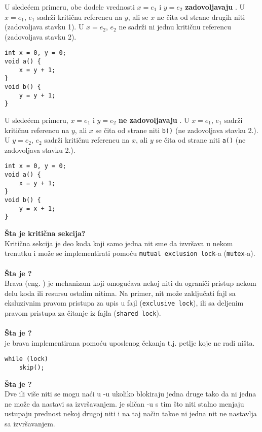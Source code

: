 U slede\'{c}em primeru, obe dodele vrednosti $x=e_1$ i $y=e_2$ \textbf{zadovoljavaju} . U $x=e_1$, $e_1$ sadr\v{z}i kriti\v{c}nu referencu na $y$, ali se $x$ ne \v{c}ita od strane drugih niti (zadovoljava stavku 1). U $x=e_2$, $e_2$ ne sadr\v{z}i ni jednu kriti\v{c}nu referencu (zadovoljava stavku 2).
\begin{lstlisting}
int x = 0, y = 0;
void a() {
    x = y + 1;
}
void b() {
    y = y + 1;
}
\end{lstlisting}
U slede\'{c}em primeru, $x=e_1$ i $y=e_2$ \textbf{ne zadovoljavaju} . U $x = e_1$, $e_1$ sadr\v{z}i kriti\v{c}nu referencu na $y$, ali $x$ se \v{c}ita od strane niti \texttt{b()} (ne zadovoljava stavku 2.). U $y = e_2$, $e_2$ sadr\v{z}i kriti\v{c}nu referencu na $x$, ali $y$ se \v{c}ita od strane niti \texttt{a()} (ne zadovoljava stavku 2.).
\begin{lstlisting}
int x = 0, y = 0;
void a() {
    x = y + 1;
}
void b() {
    y = x + 1;
}
\end{lstlisting}
\textbf{\v{S}ta je kriti\v{c}na sekcija?}\\
Kriti\v{c}na sekcija je deo koda koji samo jedna nit sme da izvr\v{s}ava u nekom trenutku i mo\v{z}e se implementirati pomo\'{c}u \texttt{mutual exclusion lock}-a (\texttt{mutex}-a).
\\\\
\textbf{\v{S}ta je ?}\\
Brava (eng. ) je mehanizam koji omogu\'{c}ava nekoj niti da ograni\v{c}i pristup nekom delu koda ili resursu ostalim nitima. Na primer, nit mo\v{z}e zaklju\v{c}ati fajl sa eksluzivnim pravom pristupa za upis u fajl (\texttt{exclusive lock}), ili sa deljenim pravom pristupa  za \v{c}itanje iz fajla (\texttt{shared lock}).
\\\\
\textbf{\v{S}ta je ?}\\
 je brava implementirana pomo\'{c}u uposlenog \v{c}ekanja t.j. petlje koje ne radi ni\v{s}ta.
\begin{lstlisting}
while (lock)
    skip();
\end{lstlisting}
\textbf{\v{S}ta je ?}\\
Dve ili vi\v{s}e niti se mogu na\'{c}i u -u ukoliko blokiraju jedna druge tako da ni jedna ne mo\v{z}e da nastavi sa izvr\v{s}avanjem.  je sli\v{c}an -u s tim \v{s}to niti stalno menjaju ustupaju prednost nekoj drugoj niti i na taj na\v{c}in tako\dj{}e ni jedna nit ne nastavlja sa izvr\v{s}avanjem.
